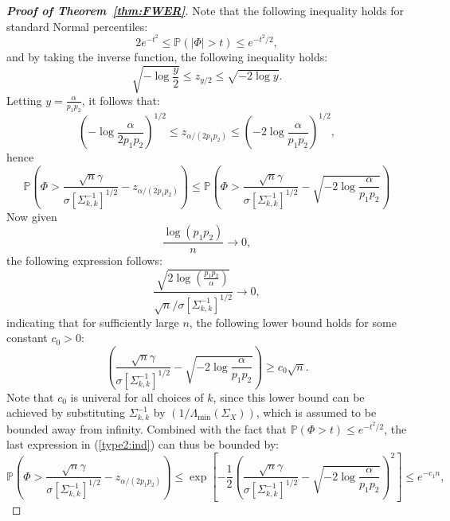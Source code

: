 \begin{proof}[\textbf{Proof of Theorem~\ref{thm:FWER}}]
	Note that the following inequality holds for standard Normal percentiles:
	\begin{equation*}
	2e^{-t^2}\leq \mathbb{P}(|\Phi|>t) \leq e^{-t^2/2},
	\end{equation*}
	and by taking the inverse function, the following inequality holds:
	\begin{equation*}
	\sqrt{-\log \frac{y}{2}} \leq z_{y/2} \leq \sqrt{-2\log y}.
	\end{equation*}
	Letting $y=\frac{\alpha}{p_1p_2}$, it follows that:
	\begin{equation*}
	\left( -\log\frac{\alpha}{2p_1p_2}\right)^{1/2} \leq z_{\alpha/(2p_1p_2)}\leq \left( -2\log \frac{\alpha}{p_1p_2} \right)^{1/2},
	\end{equation*}
	hence
	\begin{equation*}
	\mathbb{P}\left(  \Phi >\frac{\sqrt{n}\gamma}{\sigma[\Sigma^{-1}_{k,k}]^{1/2}}-z_{\alpha/(2p_1p_2)}  \right)\leq \mathbb{P}\left(  \Phi >\frac{\sqrt{n}\gamma}{\sigma[\Sigma^{-1}_{k,k}]^{1/2}}-\sqrt{-2\log \frac{\alpha}{p_1p_2}}\right)
	\end{equation*}
	Now given 
	\begin{equation*}
	\frac{\log(p_1p_2) }{n} \rightarrow 0, 
	\end{equation*}
	the following expression follows:
	\begin{equation*}
	\frac{\sqrt{2\log\left(\frac{p_1p_2}{\alpha}\right)}}{\sqrt{n}/\sigma[\Sigma^{-1}_{k,k}]^{1/2}}\rightarrow 0,
	\end{equation*}
	indicating that for sufficiently large $n$, the following lower bound holds for some constant $c_0>0$:
\begin{equation*}
\left(\frac{\sqrt{n}\gamma}{\sigma[\Sigma^{-1}_{k,k}]^{1/2}}-\sqrt{-2\log \frac{\alpha}{p_1p_2}}\right) \geq c_0\sqrt{n}.
\end{equation*}
Note that $c_0$ is univeral for all choices of $k$, since this lower bound can be achieved by substituting $\Sigma^{-1}_{k,k}$ by $(1/\Lambda_{\min}(\Sigma_X))$, which is assumed to be bounded away from infinity.  Combined with the fact that $\mathbb{P}(\Phi >t)\leq e^{-t^2/2}$, the last expression in (\ref{type2:ind}) can thus be bounded by:
\begin{equation}\label{powerbound1}
	\mathbb{P}\left( \Phi >  \frac{\sqrt{n}\gamma}{\sigma[\Sigma^{-1}_{k,k}]^{1/2}}-z_{\alpha/(2p_1p_2)} \right) \leq \exp\left[ -\frac{1}{2} \left(\frac{\sqrt{n}\gamma}{\sigma[\Sigma^{-1}_{k,k}]^{1/2}}-\sqrt{-2\log \frac{\alpha}{p_1p_2}}\right)^2 \right] \leq  e^{-c_1 n}, 

\end{equation}
\end{proof}
